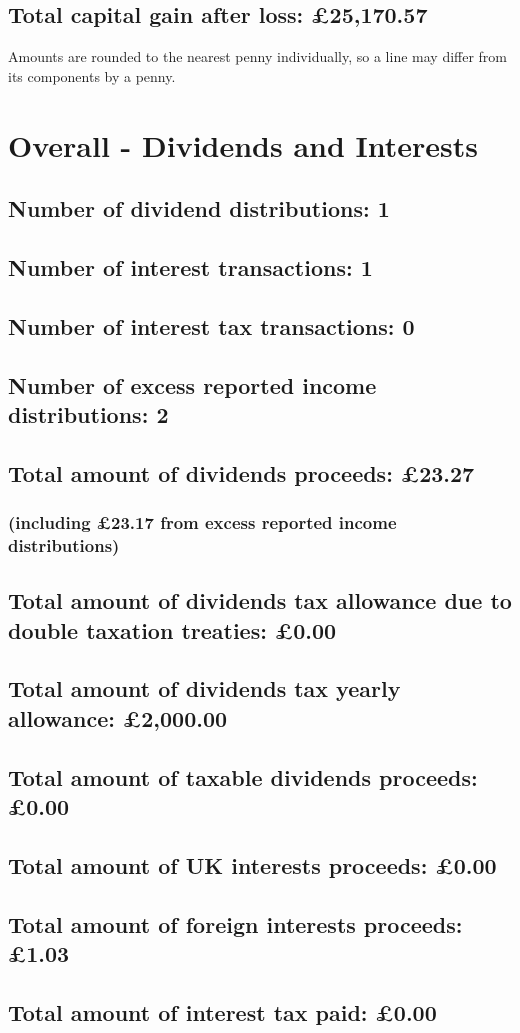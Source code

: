 \documentclass{article}
\begin{document}
\subsection*{Total capital gain after loss: £25,170.57}
\vspace{1em}
Amounts are rounded to the nearest penny individually, so a line may differ from its components by a penny.
\vspace{2em}
\section*{Overall - Dividends and Interests}
\subsection*{Number of dividend distributions: 1}
\subsection*{Number of interest transactions: 1}
\subsection*{Number of interest tax transactions: 0}
\subsection*{Number of excess reported income distributions: 2}
\subsection*{Total amount of dividends proceeds: £23.27}
\subsubsection*{   (including £23.17 from excess reported income distributions)}
\subsection*{Total amount of dividends tax allowance due to double taxation treaties: £0.00}
\subsection*{Total amount of dividends tax yearly allowance: £2,000.00}
\subsection*{Total amount of taxable dividends proceeds: £0.00}
\subsection*{Total amount of UK interests proceeds: £0.00}
\subsection*{Total amount of foreign interests proceeds: £1.03}
\subsection*{Total amount of interest tax paid: £0.00}
\end{document}
